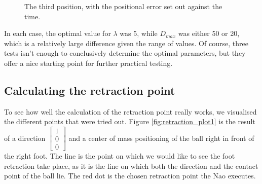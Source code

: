 \documentclass[a4paper]{article}
\begin{document}
\begin{figure}[htbp]
  \centering
  \caption{The third position, with the positional error set out against
         the time.}
  \label{fig:ik_plot3}
\end{figure}
\FloatBarrier

In each case, the optimal value for $\lambda$ was 5, while $D_{max}$ was either
50 or 20, which is a relatively large difference given the range of values. Of
course, three tests isn't enough to conclusively determine the optimal
parameters, but they offer a nice starting point for further practical testing.


\subsection{Calculating the retraction point}
To see how well the calculation of the retraction point really works, we
visualised the different points that were tried out. Figure \ref{fig:retraction_plot1}
is the result of a direction 
$\begin{bmatrix} 1 \\  0 \\ 0 \end{bmatrix}$ and a center of mass positioning of
    the ball right in front of the right foot. The line is the point on which we
    would like to see the foot retraction take place, as it is the line on which
    both the direction and the contact point of the ball lie. The red dot is the
    chosen retraction point the Nao executes.
\end{document}
